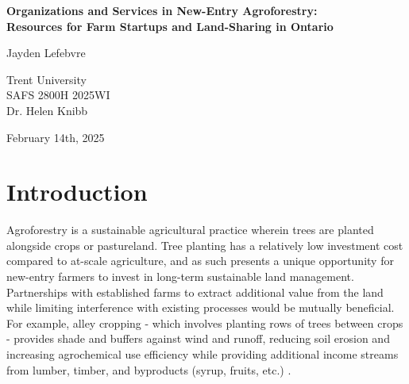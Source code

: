 \documentclass{report}
\begin{document}
\begin{titlepage}
    \begin{center}
        \vspace*{1.2cm}

        \textbf{Organizations and Services in New-Entry Agroforestry:\\Resources for Farm Startups and Land-Sharing in Ontario}

        \vspace{2cm}

        Jayden Lefebvre\\

        \vspace{5cm}
        
        Trent University\\
        SAFS 2800H 2025WI\\
        Dr. Helen Knibb\\

        \vfill

        February 14th, 2025
        
    \end{center}
\end{titlepage}

\thispagestyle{plain}
\tableofcontents

\clearpage


\section{Introduction}


\hspace{24pt}Agroforestry is a sustainable agricultural practice wherein trees are planted alongside crops or pastureland. Tree planting has a relatively low investment cost compared to at-scale agriculture, and as such presents a unique opportunity for new-entry farmers to invest in long-term sustainable land management. Partnerships with established farms to extract additional value from the land while limiting interference with existing processes would be mutually beneficial. For example, alley cropping - which involves planting rows of trees between crops - provides shade and buffers against wind and runoff, reducing soil erosion and increasing agrochemical use efficiency while providing additional income streams from lumber, timber, and byproducts (syrup, fruits, etc.) \parencite{benefits}.
\end{document}
